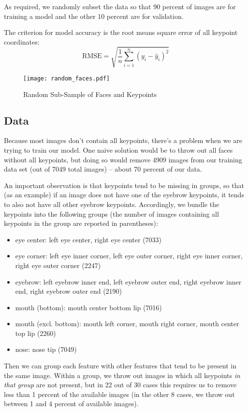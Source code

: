 \documentclass{article}
\begin{document}
As required, we randomly subset the data so that 90 percent of images are for training a model and the other 10 percent are for validation.

The criterion for model accuracy is the root means square error of all keypoint coordinates:
\[ \text{RMSE}=\sqrt{\frac{1}{n} \sum_{i=1}^{n} \left( y_i - \hat{y}_i\right)^2} \]

\begin{figure}[!ht]
  \centering
  \caption{Random Sub-Sample of Faces and Keypoints}
  \texttt{[image: random\_faces.pdf]}
  \label{fig:random_faces}
\end{figure}

\subsection{Data}

Because most images don't contain all keypoints, there's a problem when we are trying to train our model. One naive solution would be to throw out all faces without all keypoints, but doing so would remove 4909 images from our training data set (out of 7049 total images) -- about 70 percent of our data.

An important observation is that keypoints tend to be missing in groups, so that (as an example) if an image does not have one of the eyebrow keypoints, it tends to also not have all other eyebrow keypoints. Accordingly, we bundle the keypoints into the following groups (the number of images containing all keypoints in the group are reported in parentheses):
\begin{itemize}
\item eye center: left eye center, right eye center (7033)
\item eye corner: left eye inner corner, left eye outer corner, right eye inner corner, right eye outer corner (2247)
\item eyebrow: left eyebrow inner end, left eyebrow outer end, right eyebrow inner end, right eyebrow outer end (2190)
\item mouth (bottom): mouth center bottom lip (7016)
\item mouth (excl. bottom): mouth left corner, mouth right corner, mouth center top lip (2260)
\item nose: nose tip (7049)
\end{itemize}
Then we can group each feature with other features that tend to be present in the same image. Within a group, we throw out images in which all keypoints \textit{in that group} are not present, but in 22 out of 30 cases this requires us to remove less than 1 percent of the available images (in the other 8 cases, we throw out between 1 and 4 percent of available images).
\end{document}
